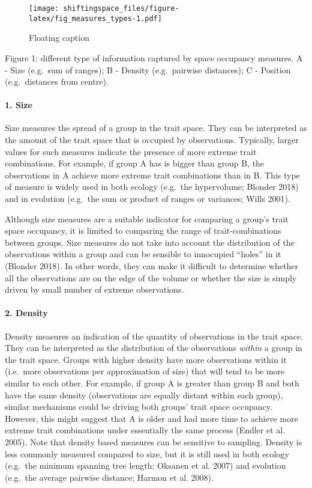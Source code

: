\documentclass[]{article}
\let\oldparagraph\paragraph
\renewcommand{\paragraph}[1]{\oldparagraph{#1}\mbox{}}
\begin{document}
\begin{figure}
\centering
\texttt{[image: shiftingspace\_files/figure-latex/fig\_measures\_types-1.pdf]}
\caption{Floating caption}
\end{figure}
Figure 1: different type of information captured by space
occupancy measures. A - Size (e.g.~sum of ranges); B - Density
(e.g.~pairwise distances); C - Position (e.g.~distances from centre).

\paragraph{1. Size}\label{size}

Size measures the spread of a group in the trait space. They can be
interpreted as the amount of the trait space that is occupied by
observations. Typically, larger values for such measures indicate the
presence of more extreme trait combinations. For example, if group A has
is bigger than group B, the observations in A achieve more extreme trait
combinations than in B. This type of measure is widely used in both
ecology (e.g.~the hypervolume; Blonder 2018) and in evolution (e.g.~the
sum or product of ranges or variances; Wills 2001).

Although size measures are a suitable indicator for comparing a group's
trait space occupancy, it is limited to comparing the range of
trait-combinations between groups. Size measures do not take into
account the distribution of the observations within a group and can be
sensible to innocupied ``holes'' in it (Blonder 2018). In other words,
they can make it difficult to determine whether all the observations are
on the edge of the volume or whether the size is simply driven by small
number of extreme observations.

\paragraph{2. Density}\label{density}

Density measures an indication of the quantity of observations in the
trait space. They can be interpreted as the distribution of the
observations \emph{within} a group in the trait space. Groups with
higher density have more observations within it (i.e.~more observations
per approximation of size) that will tend to be more similar to each
other. For example, if group A is greater than group B and both have the
same density (observations are equally distant within each group),
similar mechanisms could be driving both groups' trait space occupancy.
However, this might suggest that A is older and had more time to achieve
more extreme trait combinations under essentially the same process
(Endler et al. 2005). Note that density based measures can be sensitive
to sampling. Density is less commonly measured compared to size, but it
is still used in both ecology (e.g.~the minimum spanning tree length;
Oksanen et al. 2007) and evolution (e.g.~the average pairwise distance;
Harmon et al. 2008).
\end{document}
